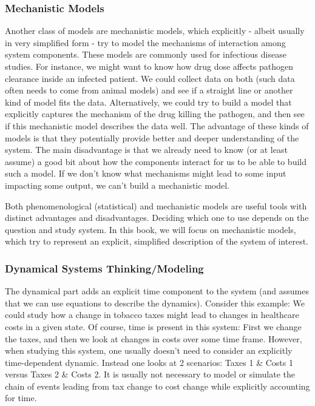 \documentclass[]{article}
\theoremstyle{definition}
\theoremstyle{definition}
\theoremstyle{definition}
\theoremstyle{remark}
\begin{document}
\subsubsection{Mechanistic Models}\label{mechanistic-models}

Another class of models are mechanistic models, which explicitly -
albeit usually in very simplified form - try to model the mechanisms of
interaction among system components. These models are commonly used for
infectious disease studies. For instance, we might want to know how drug
dose affects pathogen clearance inside an infected patient. We could
collect data on both (such data often needs to come from animal models)
and see if a straight line or another kind of model fits the data.
Alternatively, we could try to build a model that explicitly captures
the mechanism of the drug killing the pathogen, and then see if this
mechanistic model describes the data well. The advantage of these kinds
of models is that they potentially provide better and deeper
understanding of the system. The main disadvantage is that we already
need to know (or at least assume) a good bit about how the components
interact for us to be able to build such a model. If we don't know what
mechanisms might lead to some input impacting some output, we can't
build a mechanistic model.

Both phenomenological (statistical) and mechanistic models are useful
tools with distinct advantages and disadvantages. Deciding which one to
use depends on the question and study system. In this book, we will
focus on mechanistic models, which try to represent an explicit,
simplified description of the system of interest.

\subsubsection{Dynamical Systems
Thinking/Modeling}\label{dynamical-systems-thinkingmodeling}

The dynamical part adds an explicit time component to the system (and
assumes that we can use equations to describe the dynamics). Consider
this example: We could study how a change in tobacco taxes might lead to
changes in healthcare costs in a given state. Of course, time is present
in this system: First we change the taxes, and then we look at changes
in costs over some time frame. However, when studying this system, one
usually doesn't need to consider an explicitly time-dependent dynamic.
Instead one looks at 2 scenarios: Taxes 1 \& Costs 1 versus Taxes 2 \&
Costs 2. It is usually not necessary to model or simulate the chain of
events leading from tax change to cost change while explicitly
accounting for time.
\end{document}
